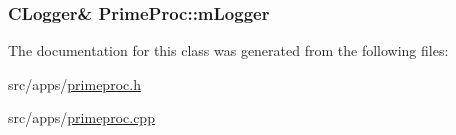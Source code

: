 \subsubsection[{\texorpdfstring{m\+Logger}{mLogger}}]{\setlength{\rightskip}{0pt plus 5cm}C\+Logger\& Prime\+Proc\+::m\+Logger\hspace{0.3cm}{\ttfamily [protected]}}\hypertarget{classPrimeProc_ae88d8aee3d4b7dedd75888b83b3345de}{}\label{classPrimeProc_ae88d8aee3d4b7dedd75888b83b3345de}


The documentation for this class was generated from the following files\+:\begin{DoxyCompactItemize}
\item 
src/apps/\hyperlink{primeproc_8h}{primeproc.\+h}\item 
src/apps/\hyperlink{primeproc_8cpp}{primeproc.\+cpp}\end{DoxyCompactItemize}
